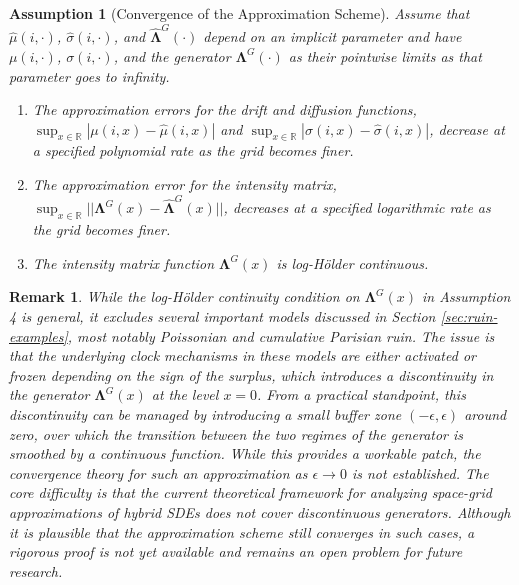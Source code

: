 \documentclass[11pt]{article}
\numberwithin{table}{section}
\numberwithin{figure}{section}
\numberwithin{equation}{section}
\newcommand{\1}{{\mathbf 1}}
\newcommand{\0}{\mat{0}}
\newtheorem{assumption}{Assumption}
\newtheorem{remark}{Remark}[section]
\begin{document}
\begin{assumption}[Convergence of the Approximation Scheme] Assume that $\hat{\mu}(i,\cdot)$, $\hat{\sigma}(i,\cdot)$, and $\hat{\bm{\Lambda}}^G(\cdot)$ depend on an implicit parameter and have $\mu(i,\cdot)$, $\sigma(i,\cdot)$, and the generator $\bm{\Lambda}^G(\cdot)$ as their pointwise limits as that parameter goes to infinity.
\label{ass:convergence_final}
\begin{enumerate}
    \item[A3.] The approximation errors for the drift and diffusion functions, $\sup_{x\in\mathbb{R}}|\mu(i,x) - \hat{\mu}(i,x)|$ and $\sup_{x\in\mathbb{R}}|\sigma(i,x) - \hat{\sigma}(i,x)|$, decrease at a specified polynomial rate as the grid becomes finer. 
    \item[A4.] The approximation error for the intensity matrix, $\sup_{x\in\mathbb{R}}||\bm{\Lambda}^G(x) - \hat{\bm{\Lambda}}^G(x)||$, decreases at a specified logarithmic rate as the grid becomes finer. 
    \item[A5.] The intensity matrix function $\bm{\Lambda}^G(x)$ is log-Hölder continuous. 
\end{enumerate}
\end{assumption}

\begin{remark}\label{rem:log-holder}
While the log-Hölder continuity condition on $\bm{\Lambda}^G(x)$ in Assumption 4 is general, it excludes several important models discussed in Section \ref{sec:ruin-examples}, most notably Poissonian and cumulative Parisian ruin. The issue is that the underlying clock mechanisms in these models are either activated or frozen depending on the sign of the surplus, which introduces a discontinuity in the generator $\bm{\Lambda}^G(x)$ at the level $x=0$. From a practical standpoint, this discontinuity can be managed by introducing a small buffer zone $(-\epsilon, \epsilon)$ around zero, over which the transition between the two regimes of the generator is smoothed by a continuous function. While this provides a workable patch, the convergence theory for such an approximation as $\epsilon \to 0$ is not established. The core difficulty is that the current theoretical framework for analyzing space-grid approximations of hybrid SDEs does not cover discontinuous generators. Although it is plausible that the approximation scheme still converges in such cases, a rigorous proof is not yet available and remains an open problem for future research.
\end{remark}
\end{document}
